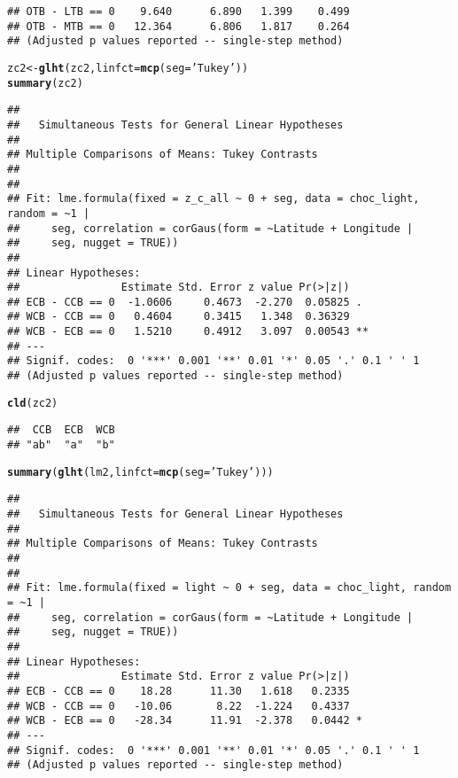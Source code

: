 \documentclass[letterpaper,12pt]{article}\usepackage[]{graphicx}\usepackage[]{color}
\makeatletter
\newcommand{\hlstr}[1]{\textcolor[rgb]{0.192,0.494,0.8}{#1}}%
\newcommand{\hlstd}[1]{\textcolor[rgb]{0.345,0.345,0.345}{#1}}%
\newcommand{\hlkwb}[1]{\textcolor[rgb]{0.69,0.353,0.396}{#1}}%
\newcommand{\hlkwc}[1]{\textcolor[rgb]{0.333,0.667,0.333}{#1}}%
\newcommand{\hlkwd}[1]{\textcolor[rgb]{0.737,0.353,0.396}{\textbf{#1}}}%
\newenvironment{kframe}{%
 \def\at@end@of@kframe{}%
 \ifinner\ifhmode%
  \def\at@end@of@kframe{\end{minipage}}%
  \begin{minipage}{\columnwidth}%
 \fi\fi%
 \def\FrameCommand##1{\hskip\@totalleftmargin \hskip-\fboxsep
 \colorbox{shadecolor}{##1}\hskip-\fboxsep
     \hskip-\linewidth \hskip-\@totalleftmargin \hskip\columnwidth}%
 \MakeFramed {\advance\hsize-\width
   \@totalleftmargin\z@ \linewidth\hsize
   \@setminipage}}%
 {\par\unskip\endMakeFramed%
 \at@end@of@kframe}
\newenvironment{knitrout}{}{} %
\makeatother
\begin{document}
\begin{knitrout}
\begin{kframe}
\begin{verbatim}
## OTB - LTB == 0    9.640      6.890   1.399    0.499
## OTB - MTB == 0   12.364      6.806   1.817    0.264
## (Adjusted p values reported -- single-step method)
\end{verbatim}
\begin{alltt}
\hlstd{zc2} \hlkwb{<-} \hlkwd{glht}\hlstd{(zc2,} \hlkwc{linfct} \hlstd{=} \hlkwd{mcp}\hlstd{(}\hlkwc{seg} \hlstd{=} \hlstr{'Tukey'}\hlstd{))}
\hlkwd{summary}\hlstd{(zc2)}
\end{alltt}
\begin{verbatim}
## 
## 	 Simultaneous Tests for General Linear Hypotheses
## 
## Multiple Comparisons of Means: Tukey Contrasts
## 
## 
## Fit: lme.formula(fixed = z_c_all ~ 0 + seg, data = choc_light, random = ~1 | 
##     seg, correlation = corGaus(form = ~Latitude + Longitude | 
##     seg, nugget = TRUE))
## 
## Linear Hypotheses:
##                Estimate Std. Error z value Pr(>|z|)   
## ECB - CCB == 0  -1.0606     0.4673  -2.270  0.05825 . 
## WCB - CCB == 0   0.4604     0.3415   1.348  0.36329   
## WCB - ECB == 0   1.5210     0.4912   3.097  0.00543 **
## ---
## Signif. codes:  0 '***' 0.001 '**' 0.01 '*' 0.05 '.' 0.1 ' ' 1
## (Adjusted p values reported -- single-step method)
\end{verbatim}
\begin{alltt}
\hlkwd{cld}\hlstd{(zc2)}
\end{alltt}
\begin{verbatim}
##  CCB  ECB  WCB 
## "ab"  "a"  "b"
\end{verbatim}
\begin{alltt}
\hlkwd{summary}\hlstd{(}\hlkwd{glht}\hlstd{(lm2,} \hlkwc{linfct} \hlstd{=} \hlkwd{mcp}\hlstd{(}\hlkwc{seg} \hlstd{=} \hlstr{'Tukey'}\hlstd{)))}
\end{alltt}
\begin{verbatim}
## 
## 	 Simultaneous Tests for General Linear Hypotheses
## 
## Multiple Comparisons of Means: Tukey Contrasts
## 
## 
## Fit: lme.formula(fixed = light ~ 0 + seg, data = choc_light, random = ~1 | 
##     seg, correlation = corGaus(form = ~Latitude + Longitude | 
##     seg, nugget = TRUE))
## 
## Linear Hypotheses:
##                Estimate Std. Error z value Pr(>|z|)  
## ECB - CCB == 0    18.28      11.30   1.618   0.2335  
## WCB - CCB == 0   -10.06       8.22  -1.224   0.4337  
## WCB - ECB == 0   -28.34      11.91  -2.378   0.0442 *
## ---
## Signif. codes:  0 '***' 0.001 '**' 0.01 '*' 0.05 '.' 0.1 ' ' 1
## (Adjusted p values reported -- single-step method)
\end{verbatim}

\end{kframe}
\end{knitrout}
\end{document}
